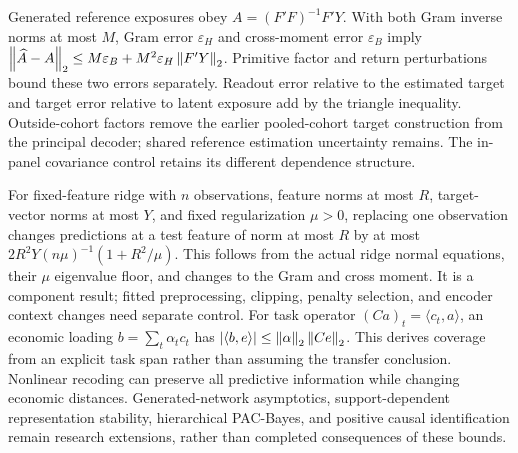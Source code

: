 \documentclass[11pt]{article}
\renewcommand{\lean}[1]{\ignorespaces}
\renewcommand{\leanok}{\ignorespaces}
\begin{document}
Generated reference exposures obey $A={(F'F)}^{-1}F'Y$.
With both Gram inverse norms at most $M$, Gram error $\varepsilon_H$ and
cross-moment error $\varepsilon_B$ imply
$\left\lVert\widehat A-A\right\rVert_2\le M\varepsilon_B+M^2\varepsilon_H\left\lVert F'Y\right\rVert_2$.
\lean{FreeFoundations.GeneratedTarget.normal_equation_error}\leanok{}
Primitive factor and return perturbations bound these two errors separately.
Readout error relative to the estimated target and target error relative to
latent exposure add by the triangle inequality. Outside-cohort factors remove
the earlier pooled-cohort target construction from the principal decoder;
shared reference estimation uncertainty remains. The in-panel covariance
control retains its different dependence structure.

For fixed-feature ridge with $n$ observations, feature norms at most
$R$, target-vector norms at most $Y$, and fixed regularization
$\mu>0$, replacing
one observation changes predictions at a test feature of norm at most $R$ by
at most $2R^2Y{(n\mu)}^{-1}(1+R^2/\mu)$.
\lean{FreeFoundations.ReadoutStability.vector_prediction_replacement_le,
FreeFoundations.ReadoutStability.operator_objective_gap}\leanok{}
This follows from the actual ridge normal equations, their $\mu$ eigenvalue
floor, and changes to the Gram and cross moment. It is a component result;
fitted preprocessing, clipping, penalty selection, and encoder context changes
need separate control. For task operator ${(Ca)}_t=\langle
c_t,a\rangle$, an economic loading
$b=\sum_t\alpha_t c_t$ has
$|\langle b,e\rangle|\le\left\lVert\alpha\right\rVert_2\left\lVert Ce\right\rVert_2$.
This derives coverage from an explicit task span rather than assuming the
transfer conclusion.
\lean{FreeFoundations.TaskCoverage.covered_error}\leanok{}
Nonlinear recoding can preserve all predictive information while changing
economic distances.
\lean{FreeFoundations.Geometry.nonlinear_codes_sufficient,
FreeFoundations.Geometry.nonlinear_codes_distort}\leanok{}
Generated-network asymptotics, support-dependent representation stability,
hierarchical PAC-Bayes, and positive causal identification remain research
extensions, rather than completed consequences of these bounds.
\end{document}
